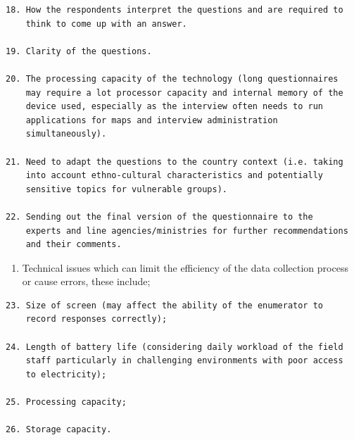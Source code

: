 \documentclass[
]{article}
\providecommand{\tightlist}{%
  \setlength{\itemsep}{0pt}\setlength{\parskip}{0pt}}
\begin{document}
\begin{verbatim}
18. How the respondents interpret the questions and are required to
    think to come up with an answer.

19. Clarity of the questions.

20. The processing capacity of the technology (long questionnaires
    may require a lot processor capacity and internal memory of the
    device used, especially as the interview often needs to run
    applications for maps and interview administration
    simultaneously).

21. Need to adapt the questions to the country context (i.e. taking
    into account ethno-cultural characteristics and potentially
    sensitive topics for vulnerable groups).

22. Sending out the final version of the questionnaire to the
    experts and line agencies/ministries for further recommendations
    and their comments.
\end{verbatim}

\begin{enumerate}
\def\labelenumi{\arabic{enumi}.}
\setcounter{enumi}{313}
\tightlist
\item
  Technical issues which can limit the efficiency of the data
  collection process or cause errors, these include;
\end{enumerate}

\begin{verbatim}
23. Size of screen (may affect the ability of the enumerator to
    record responses correctly);

24. Length of battery life (considering daily workload of the field
    staff particularly in challenging environments with poor access
    to electricity);

25. Processing capacity;

26. Storage capacity.
\end{verbatim}
\end{document}
